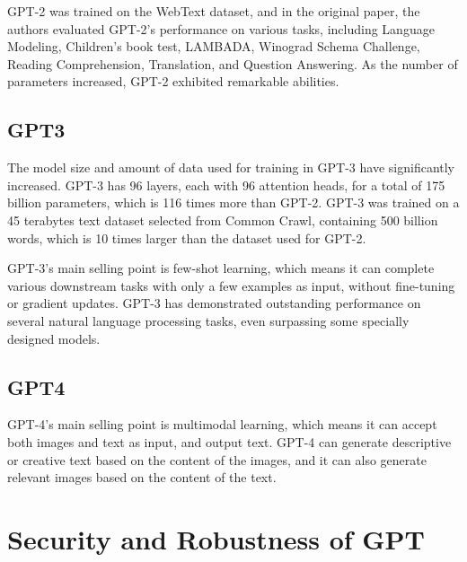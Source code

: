 \documentclass[conference]{IEEEtran}
\begin{document}
\par GPT-2 was trained on the WebText dataset, and in the original paper, 
the authors evaluated GPT-2's performance on various tasks, including Language Modeling, 
Children's book test, LAMBADA, Winograd Schema Challenge, Reading Comprehension, 
Translation, and Question Answering. As the number of parameters increased, 
GPT-2 exhibited remarkable abilities.

\subsection{GPT3}

\par The model size and amount of data used for training in GPT-3 have significantly 
increased. GPT-3 has 96 layers, each with 96 attention heads, for a total of 175 billion 
parameters, which is 116 times more than GPT-2. GPT-3 was trained on a 45 terabytes 
text dataset selected from Common Crawl, containing 500 billion words, which is 
10 times larger than the dataset used for GPT-2.

\par GPT-3's main selling point is few-shot learning, which means it can complete various 
downstream tasks with only a few examples as input, without fine-tuning or gradient 
updates. GPT-3 has demonstrated outstanding performance on several natural language 
processing tasks, even surpassing some specially designed models.

\subsection{GPT4}

\par GPT-4's main selling point is multimodal learning, which means it 
can accept both images and text as input, and output text. 
GPT-4 can generate descriptive or creative text based on the content 
of the images, and it can also generate relevant images based on the content 
of the text. 



\section{Security and Robustness of GPT}










\vspace{12pt}
\end{document}

